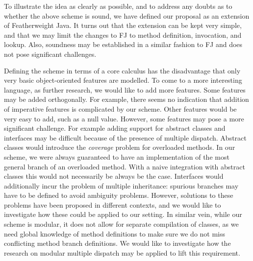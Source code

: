 \documentclass[11pt]{article}
\begin{document}
To illustrate the idea as clearly as possible, and to address any doubts as to whether the above scheme is sound, we have defined our proposal as an extension of Featherweight Java. It turns out that the extension can be kept very simple, and that we may limit the changes to FJ to method definition, invocation, and lookup. Also, soundness may be established in a similar fashion to FJ and does not pose significant challenges.

Defining the scheme in terms of a core calculus has the disadvantage that only very basic object-oriented features are modelled. To come to a more interesting language, as further research, we would like to add more features. Some features may be added orthogonally. For example, there seems no indication that addition of imperative features is complicated by our scheme. Other features would be very easy to add, such as a null value. However, some features may pose a more significant challenge. For example adding support for abstract classes and interfaces may be difficult because of the presence of multiple dispatch. Abstract classes would introduce the \emph{coverage} problem for overloaded methods. In our scheme, we were always guaranteed to have an implementation of the most general branch of an overloaded method. With a naive integration with abstract classes this would not necessarily be always be the case. Interfaces would additionally incur the problem of multiple inheritance: spurious branches may have to be defined to avoid ambiguity problems. However, solutions to these problems have been proposed in different contexts, and we would like to investigate how these could be applied to our setting. In similar vein, while our scheme is modular, it does not allow for separate compilation of classes, as we need global knowledge of method definitions to make sure we do not miss conflicting method branch definitions. We would like to investigate how the research on modular multiple dispatch may be applied to lift this requirement.
\end{document}
